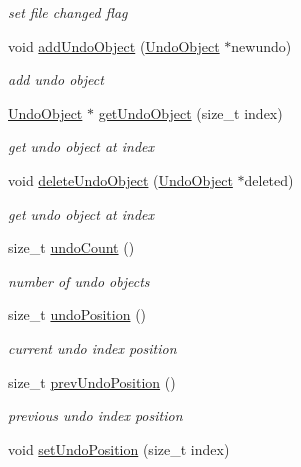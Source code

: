\begin{DoxyCompactItemize}
\begin{DoxyCompactList}\small\item\em set file changed flag \end{DoxyCompactList}\item 
void \hyperlink{classShipCAD_1_1ShipCADModel_ab79232c9ce03bda04f47ff614f87cea4}{add\-Undo\-Object} (\hyperlink{classShipCAD_1_1UndoObject}{Undo\-Object} $\ast$newundo)
\begin{DoxyCompactList}\small\item\em add undo object \end{DoxyCompactList}\item 
\hyperlink{classShipCAD_1_1UndoObject}{Undo\-Object} $\ast$ \hyperlink{classShipCAD_1_1ShipCADModel_a0acb4ae206e2caee0f87ebd229b7c90b}{get\-Undo\-Object} (size\-\_\-t index)
\begin{DoxyCompactList}\small\item\em get undo object at index \end{DoxyCompactList}\item 
void \hyperlink{classShipCAD_1_1ShipCADModel_a0c14ab36acacc74411446a65ffadaa06}{delete\-Undo\-Object} (\hyperlink{classShipCAD_1_1UndoObject}{Undo\-Object} $\ast$deleted)
\begin{DoxyCompactList}\small\item\em get undo object at index \end{DoxyCompactList}\item 
size\-\_\-t \hyperlink{classShipCAD_1_1ShipCADModel_a1d7ffa7d873dc1f43d21a62054ae356c}{undo\-Count} ()
\begin{DoxyCompactList}\small\item\em number of undo objects \end{DoxyCompactList}\item 
size\-\_\-t \hyperlink{classShipCAD_1_1ShipCADModel_a28d6c179e54a1e19997a0da2a38e4ca5}{undo\-Position} ()
\begin{DoxyCompactList}\small\item\em current undo index position \end{DoxyCompactList}\item 
size\-\_\-t \hyperlink{classShipCAD_1_1ShipCADModel_a5d2116df534ab1347961c6ab9748d1f1}{prev\-Undo\-Position} ()
\begin{DoxyCompactList}\small\item\em previous undo index position \end{DoxyCompactList}\item 
void \hyperlink{classShipCAD_1_1ShipCADModel_aa466832784532e736a1c2a16681a6d04}{set\-Undo\-Position} (size\-\_\-t index)

\end{DoxyCompactItemize}
